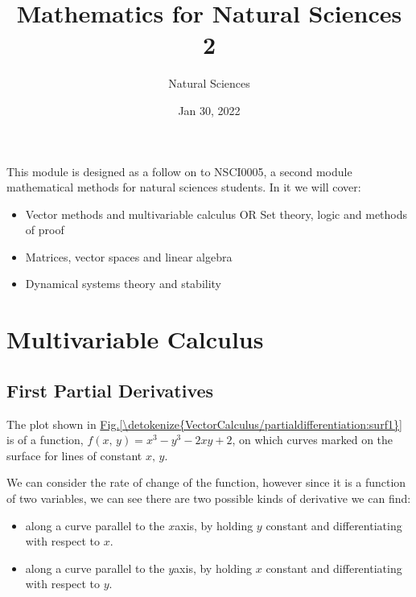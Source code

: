 \documentclass[letterpaper,10pt,english]{jupyterBook}
\title{Mathematics for Natural Sciences 2}
\date{Jan 30, 2022}
\author{Natural Sciences}
\begin{document}
\pagestyle{empty}
\sphinxmaketitle
\pagestyle{plain}
\sphinxtableofcontents
\pagestyle{normal}
\label{\detokenize{intro::doc}}


\sphinxAtStartPar
This module is designed as a follow on to NSCI0005, a second module mathematical methods for natural sciences students.  In it we will cover:
\begin{itemize}
\item {} 
\sphinxAtStartPar
Vector methods and multivariable calculus OR Set theory, logic and methods of proof

\item {} 
\sphinxAtStartPar
Matrices, vector spaces and linear algebra

\item {} 
\sphinxAtStartPar
Dynamical systems theory and stability

\end{itemize}


\chapter{Multivariable Calculus}
\label{\detokenize{VectorCalculus/partialdifferentiation:multivariable-calculus}}\label{\detokenize{VectorCalculus/partialdifferentiation::doc}}

\section{First Partial Derivatives}
\label{\detokenize{VectorCalculus/partialdifferentiation:first-partial-derivatives}}
\sphinxAtStartPar
The plot shown in \hyperref[\detokenize{VectorCalculus/partialdifferentiation:surf1}]{Fig.\@ \ref{\detokenize{VectorCalculus/partialdifferentiation:surf1}}} is of a function, \(f(x,\, y)= x^3 - y^3 - 2xy + 2\), on which curves marked on the surface for lines of constant \(x,\,y\).

\sphinxAtStartPar
We can consider the rate of change of the function, however since it is a function of two variables, we can see there are two possible kinds of derivative we can find:
\begin{itemize}
\item {} 
\sphinxAtStartPar
along a curve parallel to the \(x\)\sphinxhyphen{}axis, by holding \(y\) constant and differentiating with respect to \(x\).

\item {} 
\sphinxAtStartPar
along a curve parallel to the \(y\)\sphinxhyphen{}axis, by holding \(x\) constant and differentiating with respect to \(y\).

\end{itemize}
\end{document}
